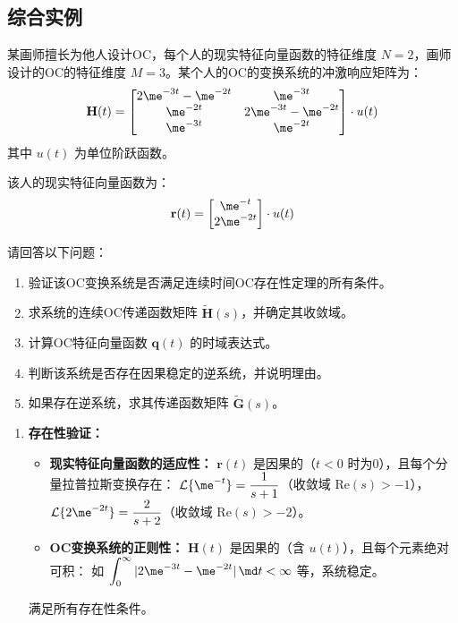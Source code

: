 \subsection{综合实例}
\begin{example}[连续时间OC变换综合题]

    某画师擅长为他人设计OC，每个人的现实特征向量函数的特征维度 $N=2$，画师设计的OC的特征维度 $M=3$。某个人的OC的变换系统的冲激响应矩阵为：
    \begin{equation}
        \mathbf{H}(t) = \begin{bmatrix}
            2\me^{-3t} - \me^{-2t} & \me^{-3t}              \\
            \me^{-2t}              & 2\me^{-3t} - \me^{-2t} \\
            \me^{-3t}              & \me^{-2t}
        \end{bmatrix} \cdot u(t)
    \end{equation}
    其中 $u(t)$ 为单位阶跃函数。

    该人的现实特征向量函数为：
    \begin{equation}
        \mathbf{r}(t) = \begin{bmatrix}
            \me^{-t} \\ 2\me^{-2t}
        \end{bmatrix} \cdot u(t)
    \end{equation}

    请回答以下问题：
    \begin{enumerate}
        \item 验证该OC变换系统是否满足连续时间OC存在性定理的所有条件。
        \item 求系统的连续OC传递函数矩阵 $\tilde{\mathbf{H}}(s)$，并确定其收敛域。
        \item 计算OC特征向量函数 $\mathbf{q}(t)$ 的时域表达式。
        \item 判断该系统是否存在因果稳定的逆系统，并说明理由。
        \item 如果存在逆系统，求其传递函数矩阵 $\tilde{\mathbf{G}}(s)$。
    \end{enumerate}

    \solution
    \begin{enumerate}
        \item \textbf{存在性验证：}
              \begin{itemize}
                  \item \textbf{现实特征向量函数的适应性：} $\mathbf{r}(t)$ 是因果的（$t<0$ 时为0），且每个分量拉普拉斯变换存在：
                        $\mathcal{L}\{\me^{-t}\} = \dfrac{1}{s+1}$（收敛域 $\mathrm{Re}(s)>-1$），
                        $\mathcal{L}\{2\me^{-2t}\} = \dfrac{2}{s+2}$（收敛域 $\mathrm{Re}(s)>-2$）。
                  \item \textbf{OC变换系统的正则性：} $\mathbf{H}(t)$ 是因果的（含 $u(t)$），且每个元素绝对可积：
                        如 $\displaystyle\int_0^\infty |2\me^{-3t}-\me^{-2t}|\,\md t < \infty$ 等，系统稳定。
              \end{itemize}
              满足所有存在性条件。


\end{enumerate}
\end{example}
